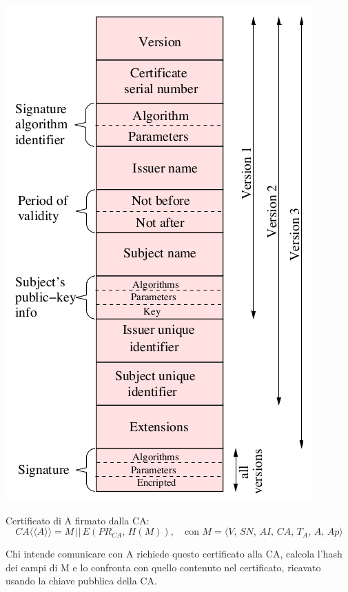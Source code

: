 \documentclass[a4paper, 11pt, twoside, openright, fleqn]{report}
\newcommand{\llangle}{\langle\!\langle}
\newcommand{\rrangle}{\rangle\!\rangle}
\begin{document}
\begin{minipage}{.45\textwidth}
	\centering
	\includegraphics[width=.95\textwidth]{images/X509}
\end{minipage}
\vspace{2em}

\noindent
Certificato di A firmato dalla CA:
\begin{equation*}
	CA\llangle A\rrangle = M \,||\, E(PR_{CA},\,H(M)),\quad
	\mbox{con } M = \langle V,\,SN,\,AI,\,CA,\,T_A,\,A,\,Ap\rangle
\end{equation*}

Chi intende comunicare con A richiede questo certificato alla CA, calcola l'hash dei campi di M e lo confronta con quello contenuto nel certificato, ricavato usando la chiave pubblica della CA.
\end{document}
